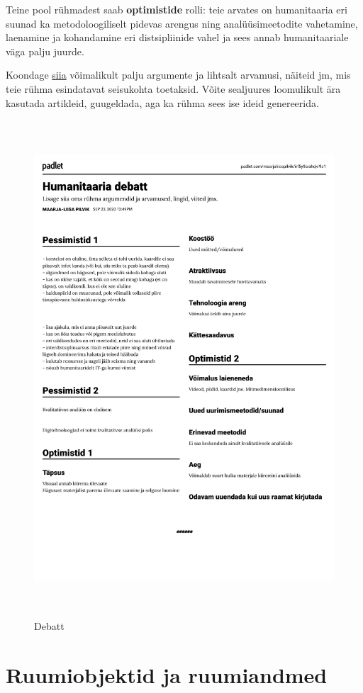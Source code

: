 \documentclass[
]{book}
\begin{document}
Teine pool rühmadest saab \textbf{optimistide} rolli: teie arvates on humanitaaria eri suunad ka metodoloogiliselt pidevas arengus ning analüüsimeetodite vahetamine, laenamine ja kohandamine eri distsipliinide vahel ja sees annab humanitaariale väga palju juurde.

Koondage \href{https://padlet.com/maarjaliisapilvik/irf5y9aiahqkr9s1}{siia} võimalikult palju argumente ja lihtsalt arvamusi, näiteid jm, mis teie rühma esindatavat seisukohta toetaksid. Võite sealjuures loomulikult ära kasutada artikleid, guugeldada, aga ka rühma sees ise ideid genereerida.

\begin{figure}
\centering
\includegraphics[width=1\textwidth,height=7.29167in]{./imgs/padlet-debatt.pdf}
\caption{Debatt}
\end{figure}

\hypertarget{ruumiobjektid}{%
\chapter{Ruumiobjektid ja ruumiandmed}\label{ruumiobjektid}}
\end{document}
